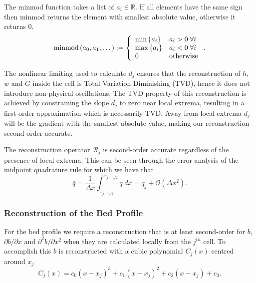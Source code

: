 \begin{defn}
The minmod function takes a list of $a_i \in \mathbb{R}$. If all elements have the same sign then minmod returns the element with smallest absolute value, otherwise it returns $0$. 
	\begin{equation*}
	\text{minmod}\left(a_0,a_1,\dots\right) := \left\lbrace \begin{array}{l l}
	\min\left\lbrace a_i\right\rbrace & a_i > 0 \; \forall i \\
	\max\left\lbrace a_i\right\rbrace & a_i < 0  \; \forall i \\
	0 & \text{otherwise}\\
	\end{array} \right. . 
	\end{equation*}
\end{defn}
The nonlinear limiting used to calculate $d_j$ ensures that the reconstruction of $h$, $w$ and $G$ inside the cell is Total Variation Diminishing (TVD), hence it does not introduce non-physical oscillations. The TVD property of this reconstruction is achieved by constraining the slope $d_j$ to zero near local extrema, resulting in a first-order approximation which is necessarily TVD. Away from local extrema $d_j$ will be the gradient with the smallest absolute value, making our reconstruction second-order accurate.

The reconstruction operator $\mathcal{R}_{j} $ is second-order accurate regardless of the presence of local extrema. This can be seen through the error analysis of the midpoint quadrature rule \cite{Davis-Rabinowitz-1984} for which we have that
\begin{equation}
\overline{q} = \frac{1}{\Delta x} \int_{x_{j-1/2}}^{x_{j+1/2}} q \; dx = q_j + \mathcal{O}\left(\Delta x^2\right).
\end{equation}

\subsubsection{Reconstruction of the Bed Profile}
For the bed profile we require a reconstruction that is at least second-order for $b$, $\partial b / \partial x$ and $\partial^2 b / \partial x^2$ when they are calculated locally from the $j^{th}$ cell. To accomplish this $b$ is reconstructed with a cubic polynomial $C_j(x)$ centred around $x_j$
\begin{equation}
C_j(x) = c_0 \left(x - x_j\right)^3 + c_1 \left(x - x_j\right)^2 + c_2 \left(x - x_j\right) + c_3.
\label{eqn:cubicforbedrecon}
\end{equation}

